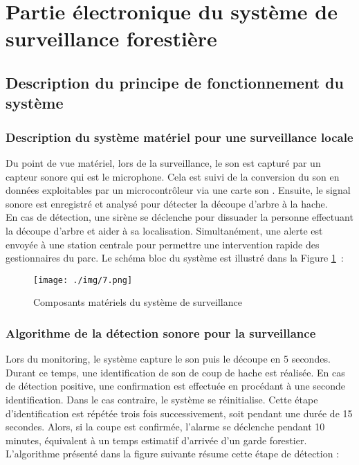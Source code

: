 \section{Partie électronique du système de surveillance forestière}
\subsection{Description du principe de fonctionnement du système}
\subsubsection{Description du système matériel pour une surveillance locale}
Du point de vue matériel, lors de la surveillance, le son est capturé par un capteur sonore qui est le microphone. Cela est suivi de la conversion du son en données exploitables par un microcontrôleur via une carte son \cite{58}. Ensuite, le signal sonore est enregistré et analysé pour détecter la découpe d’arbre à la hache. 
\\
En cas de détection, une sirène se déclenche pour dissuader la personne effectuant la découpe d'arbre et aider à sa localisation. Simultanément, une alerte est envoyée à une station centrale pour permettre une intervention rapide des gestionnaires du parc.
Le schéma bloc du système est illustré dans la Figure \ref{i7} :
\begin{figure}[H]
	\centering
	\texttt{[image: ./img/7.png]}
	\caption{Composants matériels du système de surveillance}
	\label{i7}
\end{figure}

\subsubsection{Algorithme de la détection sonore pour la surveillance}
Lors du monitoring, le système capture le son puis le découpe en 5 secondes. Durant ce temps, une identification de son de coup de hache est réalisée. En cas de détection positive, une confirmation est effectuée en procédant à une seconde identification. Dans le cas contraire, le système se réinitialise.
Cette étape d'identification est répétée trois fois successivement, soit pendant une durée de 15 secondes. Alors, si la coupe est confirmée, l'alarme se déclenche pendant 10 minutes, équivalent à un temps estimatif d'arrivée d'un garde forestier. 
\\
L'algorithme présenté dans la figure suivante résume cette étape de détection :

